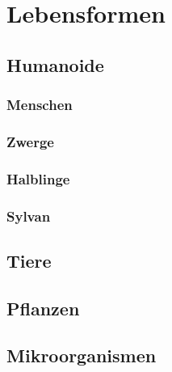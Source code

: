 \section{Lebensformen}
\subsection{Humanoide}
\subsubsection{Menschen}
\subsubsection{Zwerge}
\subsubsection{Halblinge}
\subsubsection{Sylvan} \label{rasse:sylvan}


\subsection{Tiere}
\subsection{Pflanzen}
\subsection{Mikroorganismen}